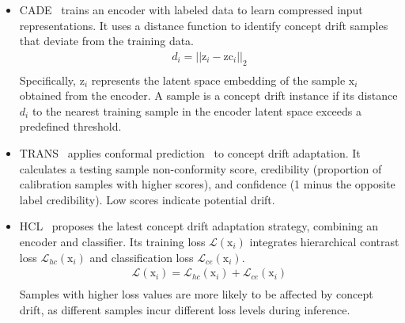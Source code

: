 \documentclass[conference,compsoc]{IEEEtran} %
\begin{document}
\begin{itemize}[leftmargin=0.35cm]

\item CADE~\cite{2021-Usenix-CDAE} trains an encoder with labeled data to learn compressed input representations. 
It uses a distance function to identify concept drift samples that deviate from the training data.
\begin{equation}
	\begin{aligned}
		d_{i} = ||\bm{\mathrm{z}}_{i}-\bm{\mathrm{zc}}_{i}||_{2} \\
	\end{aligned}
	\label{CADE}
\end{equation}
Specifically, $\bm{\mathrm{z}}_{i}$ represents the latent space embedding of the sample $\bm{\mathrm{x}}_{i}$ obtained from the encoder. 
A sample is a concept drift instance if its distance $d_{i}$ to the nearest training sample in the encoder  latent space exceeds a predefined threshold.
\item TRANS~\cite{2022-SP-Trancending}
applies conformal prediction~\cite{2005-high-cite-Algorithmic-learning-in-a-random-world} to concept drift adaptation.
It calculates a testing sample  non-conformity score, credibility (proportion of calibration samples with higher scores), and confidence (1 minus the opposite label  credibility). 
Low scores indicate potential drift.
\item HCL~\cite{2023-Usenix-chenyizhen}
proposes the latest concept drift adaptation strategy, combining an encoder and classifier. 
Its training loss $\mathcal{L}(\bm{\mathrm{x}}_{i})$ integrates hierarchical contrast loss $\mathcal{L}_{hc}(\bm{\mathrm{x}}_{i})$ and classification loss $\mathcal{L}_{ce}(\bm{\mathrm{x}}_{i})$.
\begin{equation}
	\begin{aligned}
		\mathcal{L}(\bm{\mathrm{x}}_{i}) = \mathcal{L}_{hc}(\bm{\mathrm{x}}_{i}) + \mathcal{L}_{ce}(\bm{\mathrm{x}}_{i}) \\
	\end{aligned}
	\label{CADE}
\end{equation}
Samples with higher loss values are more likely to be affected by concept drift, as different samples incur different loss levels during inference.

\end{itemize}
\end{document}
